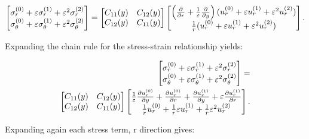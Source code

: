 \begin{equation}
    \begin{aligned}
        \begin{bmatrix}
            \sigma_{r}^{(0)} + \varepsilon\sigma_{r}^{(1)} + \varepsilon^2\sigma_{r}^{(2)}\\
            \sigma_{\theta}^{(0)} + \varepsilon\sigma_{\theta}^{(1)} + \varepsilon^2\sigma_{\theta}^{(2)}
        \end{bmatrix} = 
        \begin{bmatrix}
            C_{11}(y) &  C_{12}(y) \\
            C_{12}(y)  & C_{11}(y) 
        \end{bmatrix}
        \begin{bmatrix}
            \left(\frac{\partial}{\partial r} + \frac{1}{\varepsilon}\frac{\partial}{\partial y}\right)(u_r^{(0)} + \varepsilon u_r^{(1)} + \varepsilon^2 u_r^{(2)})\\
            \frac{1}{r}(u_r^{(0)} + \varepsilon u_r^{(1)} + \varepsilon^2 u_r^{(2)})
        \end{bmatrix}. \\
    \end{aligned}
\end{equation}

Expanding the chain rule for the stress-strain relationship yields:

\begin{equation}
    \begin{aligned}
        \begin{bmatrix}
            \sigma_{r}^{(0)} + \varepsilon\sigma_{r}^{(1)} + \varepsilon^2\sigma_{r}^{(2)}\\
            \sigma_{\theta}^{(0)} + \varepsilon\sigma_{\theta}^{(1)} + \varepsilon^2\sigma_{\theta}^{(2)}
        \end{bmatrix} = \\
        \begin{bmatrix}
            C_{11}(y) &  C_{12}(y) \\
            C_{12}(y)  & C_{11}(y) 
        \end{bmatrix}
        \begin{bmatrix}
             \frac{1}{\varepsilon} \frac{\partial u_r^{(0)}}{\partial y} + \frac{\partial u_r^{(0)}}{\partial r} + \frac{\partial u_r^{(1)}}{\partial y} + \varepsilon \frac{\partial u_r^{(1)}}{\partial r}\\
            \frac{1}{r}u_r^{(0)} + \frac{1}{r}\varepsilon u_r^{(1)} + \frac{1}{r}\varepsilon^2 u_r^{(2)} 
        \end{bmatrix}. \\
    \end{aligned}
\end{equation}

Expanding again each stress term, r direction gives:


